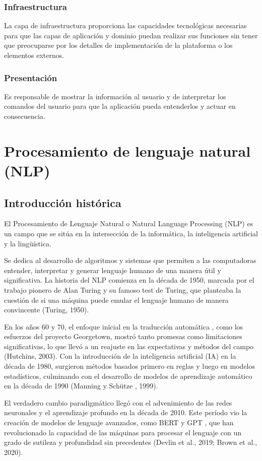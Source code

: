 \subsubsection*{Infraestructura}
La capa de infraestructura proporciona las capacidades tecnológicas necesarias para que las capas de
aplicación y dominio puedan realizar sus funciones sin tener que
preocuparse por los detalles de implementación de la plataforma o los elementos externos.

\subsubsection*{Presentación}
Es responsable de mostrar la información al usuario y de interpretar los
comandos del usuario para que la aplicación pueda entenderlos y actuar en consecuencia.

\section*{Procesamiento de lenguaje natural (NLP)}
\subsection*{Introducción histórica}
El Procesamiento de Lenguaje Natural o Natural Language Processing (NLP) es un campo que se sitúa en la
intersección de la informática, la inteligencia artificial y la lingüística.

Se dedica al desarrollo de algoritmos y sistemas que permiten a las computadoras entender, interpretar y generar
lenguaje humano de una manera útil y significativa. La historia del NLP comienza en la década de 1950, marcada
por el trabajo pionero de Alan Turing y su famoso
test de Turing, que planteaba la cuestión de si una máquina puede emular el lenguaje humano de manera convincente
(Turing, 1950).

En los años 60 y 70, el enfoque inicial en la traducción automática
, como los esfuerzos del proyecto Georgetown, mostró tanto promesas como limitaciones significativas, lo que llevó a un
reajuste en las expectativas y métodos del campo (Hutchins, 2003). Con la introducción de la inteligencia
artificial (IA) en la década de 1980, surgieron métodos basados primero en reglas y luego en modelos
estadísticos, culminando con el desarrollo de modelos de aprendizaje automático en la década de 1990 (Manning y Schütze
, 1999).

El verdadero cambio paradigmático llegó con el advenimiento de las redes neuronales y el aprendizaje profundo
en la década de 2010. Este período vio la creación de modelos de lenguaje avanzados, como BERT y GPT
, que han revolucionado la capacidad de las máquinas para procesar el lenguaje con un grado de sutileza y profundidad
sin precedentes (Devlin et al., 2019; Brown et al., 2020).

